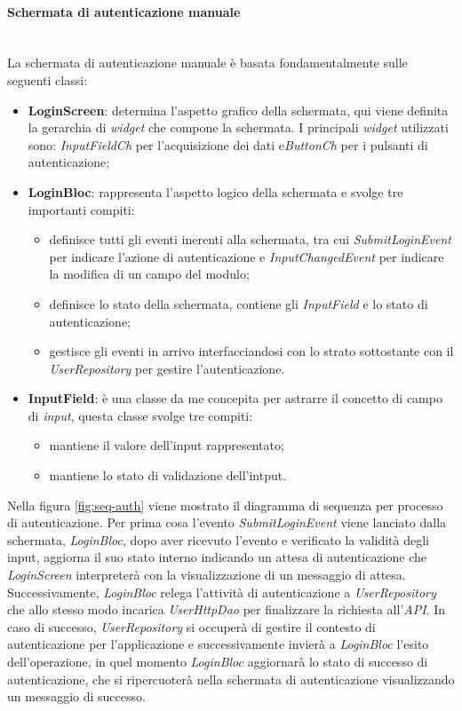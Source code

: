 \paragraph{Schermata di autenticazione manuale}\\
La schermata di autenticazione manuale è basata fondamentalmente sulle seguenti classi:
\begin{itemize}
    \item \textbf{LoginScreen}: determina l'aspetto grafico della schermata, qui viene definita la gerarchia di \textit{widget} che compone la schermata. I principali \textit{widget} utilizzati sono: \textit{InputFieldCh} per l'acquisizione dei dati e\textit{ButtonCh} per i pulsanti di autenticazione;
    \item \textbf{LoginBloc}: rappresenta l'aspetto logico della schermata e svolge tre importanti compiti:
    \begin{itemize}
        \item definisce tutti gli eventi inerenti alla schermata, tra cui \textit{SubmitLoginEvent} per indicare l'azione di autenticazione e \textit{InputChangedEvent} per indicare la modifica di un campo del modulo;
        \item definisce lo stato della schermata, contiene gli \textit{InputField} e lo stato di autenticazione;
        \item gestisce gli eventi in arrivo interfacciandosi con lo strato sottostante con il \textit{UserRepository} per gestire l'autenticazione.
    \end{itemize}
    \item \textbf{InputField}: è una classe da me concepita per astrarre il concetto di campo di \textit{input}, questa classe svolge tre compiti:
    \begin{itemize}
        \item mantiene il valore dell'input rappresentato;
        \item mantiene lo stato di validazione dell'intput.
    \end{itemize}
\end{itemize}

\noindent  Nella figura \ref{fig:seq-auth} viene mostrato il diagramma di sequenza per processo di autenticazione. Per prima cosa l'evento \textit{SubmitLoginEvent} viene lanciato dalla schermata, \textit{LoginBloc}, dopo aver ricevuto l'evento e verificato la validità degli input, aggiorna il suo stato interno indicando un attesa di autenticazione che \textit{LoginScreen} interpreterà con la visualizzazione di un messaggio di attesa. Successivamente, \textit{LoginBloc} relega l'attività di autenticazione a \textit{UserRepository} che allo stesso modo incarica \textit{UserHttpDao} per finalizzare la richiesta all'\textit{API}. In caso di successo, \textit{UserRepository} si occuperà di gestire il contesto di autenticazione per l'applicazione e successivamente invierà a \textit{LoginBloc} l'esito dell'operazione, in quel momento \textit{LoginBloc} aggiornarà lo stato di successo di autenticazione, che si ripercuoterà nella schermata di autenticazione visualizzando un messaggio di successo.

